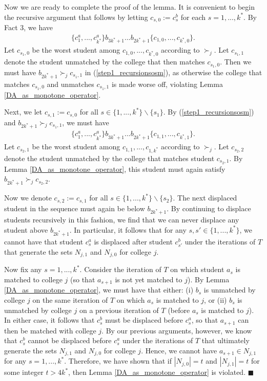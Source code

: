 \documentclass[12pt, fullpage]{amsart}
\theoremstyle{definition}
\theoremstyle{definition}
\theoremstyle{definition}
\begin{document}
\begin{bibunit}[econometrica]
Now we are ready to complete the proof of the lemma. It is convenient to begin the recursive argument that follows by letting   $c_{s,0}:=c_{s}^{b}$ for each $s=1,...,k^{*}$.  By Fact 3, we have 
\begin{align}\label{step1_recursionsosm}
	\{c_{1}^{a},...,c_{k^{*}}^{a}\}b_{3k^{*}+1}...b_{2k^{*}+1}\{c_{1,0},...,c_{k^{*},0}\}.
\end{align}
Let $c_{s_1,0}$ be the worst student among $c_{1,0},...,c_{k^{*},0}$ according to $\succ_{j}$.  Let $c_{s_1,1}$ denote the student unmatched by the college that then matches $c_{s_1,0}$. Then we must have $b_{2k^{*}+1}\succ_{j}c_{s_1,1}$ in (\ref{step1_recursionsosm}), as otherwise the college that matches $c_{s_1,0}$ and unmatches $c_{s_1,1}$ is made worse off, violating Lemma \ref{DA_as_monotone_operator}. 

Next, we let $c_{s,1}:=c_{s,0}$ for all $s\in \{1,...,k^{*}\}\backslash\{ s_1\}$. By (\ref{step1_recursionsosm}) and $b_{2k^{*}+1}\succ_{j}c_{s_1,1}$, we must have
\begin{align}\label{step2_recursion}
	\{c_{1}^{a},...,c_{k^{*}}^{a}\}b_{3k^{*}+1}...b_{2k^{*}+1}\{c_{1,1},...,c_{k^{*},1}\}.
\end{align}
Let $c_{s_2,1}$ be the worst student among $c_{1,1},...,c_{1,k^{*}}$ according to $\succ_{j}$. Let $c_{s_2,2}$ denote the student unmatched by the college that matches student $c_{s_2,1}$. By Lemma \ref{DA_as_monotone_operator}, this student must again satisfy $b_{2k^{*}+1}\succ_{j}c_{s_2,2}$.  

Now we denote $c_{s,2}:=c_{s,1}$ for all $s\in \{1,...,k^{*}\}\backslash\{s_2\}$. The next displaced student in the sequence must again be below $b_{2k^{*}+1}$. By  continuing to displace students recursively in this fashion, we find that we can never displace any student above $b_{2k^{*}+1}$. In particular, it follows that for any $s,s'\in \{1,...,k^{*}\}$,  we cannot have that student $c_{s}^{a}$ is displaced after student $c_{s'}^{b}$ under the iterations of $T$ that generate the sets $N_{j,1}$ and $N_{j,0}$ for college $j$.

Now fix any  $s=1,...,k^{*}$. Consider the iteration of $T$ on which student $a_{s}$ is matched to college $j$ (so that $a_{s+1}$ is not yet matched to $j$).  By Lemma  \ref{DA_as_monotone_operator}, we must have that either: (i) $b_{s}$  is unmatched by college $j$ on the same iteration of $T$ on which $a_{s}$ is matched to $j$, or (ii) $b_{s}$ is unmatched by college $j$ on a previous iteration of $T$ (before $a_{s}$ is matched to $j$). In either case, it follows that $c_{s}^{b}$ must be displaced before $c_{s}^{a}$, so that $a_{s+1}$ can then be matched with college $j$. By our previous arguments, however, we know that $c_{s}^{b}$ cannot be displaced before $c_{s}^{a}$ under the iterations of $T$ that ultimately generate the sets $N_{j,1}$ and $N_{j,0}$ for college $j$. Hence, we cannot have $a_{s+1}\in N_{j,1}$ for any $s=1,...,k^{*}$.  Therefore, we have shown that if  $|N_{j,0}|= t$ and $|N_{j,1}|= t$ for some integer $t>4k^{*}$, then Lemma \ref{DA_as_monotone_operator} is violated. $\blacksquare$\medskip


\end{bibunit}
\end{document}
